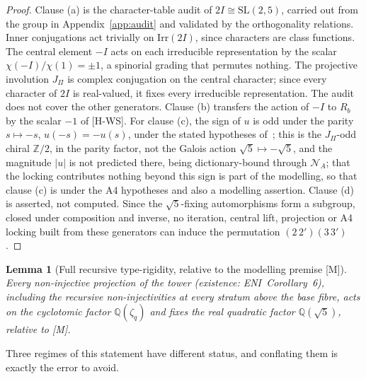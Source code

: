 \documentclass[11pt]{article}
\newtheorem{lemma}{Lemma}
\theoremstyle{definition}
\theoremstyle{remark}
\begin{document}
    \begin{proof}
      Clause (a) is the character-table audit of $2I\cong\mathrm{SL}(2,5)$, carried out from the group in
      Appendix~\ref{app:audit} and validated by the orthogonality relations.
      Inner conjugations act trivially on $\mathrm{Irr}(2I)$, since characters are class functions.
      The central element $-I$ acts on each irreducible representation by the scalar
      $\chi(-I)/\chi(1)=\pm1$, a spinorial grading that permutes nothing.
      The projective involution $J_\Pi$ is complex conjugation on the central character; since every character of $2I$
      is real-valued, it fixes every irreducible representation.
      The audit does not cover the other generators.
      Clause (b) transfers the action of $-I$ to $R_b$ by the scalar $-1$ of [H-WS].
      For clause (c), the sign of $u$ is odd under the parity $s\mapsto-s$, $u(-s)=-u(s)$, under the stated hypotheses
      of~\cite{Beau2026bim,Beau2026a4}; this is the $J_\Pi$-odd chiral $\mathbb{Z}/2$, in the parity factor, not the
      Galois action $\sqrt{5}\mapsto-\sqrt{5}$, and the magnitude $|u|$ is not predicted there, being dictionary-bound
      through $\mathcal{N}_A$; that the locking contributes nothing beyond this sign is part of the modelling, so that clause (c) is under the A4
      hypotheses and also a modelling assertion.
      Clause (d) is asserted, not computed.
      Since the $\sqrt{5}$-fixing automorphisms form a subgroup, closed under composition and inverse, no iteration,
      central lift, projection or A4 locking built from these generators can induce the permutation $(2\,2')(3\,3')$.
    \end{proof}

    \begin{lemma}[Full recursive type-rigidity, relative to the modelling premise {[M]}]
      \label{lem:rigidity}
      Every non-injective projection of the tower (existence: ENI~Corollary~6), including the recursive non-injectivities at
      every stratum above the base fibre, acts on the cyclotomic factor $\mathbb{Q}(\zeta_q)$ and fixes the real
      quadratic factor $\mathbb{Q}(\sqrt{5})$, relative to [M].
    \end{lemma}

    Three regimes of this statement have different status, and conflating them is exactly the error to avoid.
\end{document}
